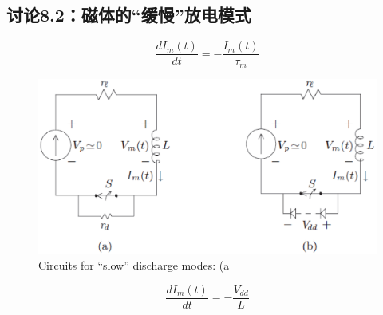 \subsection{讨论8.2：磁体的“缓慢”放电模式}
\begin{equation}%
\frac{dI_m(t)}{dt}=-\frac{I_m(t)}{\tau_m}
\end{equation}


\begin{figure}
	\centering
	\includegraphics[scale=0.6]{chpt8/figs/fig8.23.eps}
	\caption{Circuits for “slow” discharge modes: (a}
\end{figure}






\begin{equation}%
\frac{dI_m(t)}{dt}=-\frac{V_{dd}}{L}
\end{equation}


